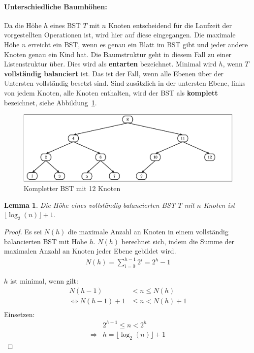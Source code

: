 \documentclass[a4paper,12pt]{article}
\newtheorem{Lemma}{Lemma}[section]
\begin{document}
\paragraph{Unterschiedliche Baumhöhen:}
Da die Höhe $h$ eines BST $T$ mit $n$ Knoten entscheidend für die Laufzeit der vorgestellten Operationen ist, wird hier auf diese eingegangen. Die maximale Höhe $n$ erreicht ein BST, wenn es genau ein Blatt im BST gibt und jeder andere Knoten genau ein Kind hat. Die Baumstruktur geht in diesem Fall zu einer Listenstruktur über. Dies wird als \textbf{entarten} bezeichnet. Minimal wird $h$, wenn $T$ \textbf{vollständig balanciert} ist. Das ist der Fall, wenn alle Ebenen über der Untersten vollständig besetzt sind. Sind zusätzlich in der untersten Ebene, links von jedem Knoten, alle Knoten enthalten, wird der BST als \textbf{komplett} bezeichnet, siehe \mbox{Abbildung \ref{fig:kompletterBaum}}. 
\begin{figure}[H]
	\centering
	\includegraphics[width= 1\textwidth]{Medien/Einleitung/kompletterBaum}
	\caption{Kompletter BST mit 12 Knoten}
	\label{fig:kompletterBaum}
\end{figure}


\begin{Lemma} Die Höhe eines vollständig balancierten BST $T$ mit $n$ Knoten ist $ \lfloor \log_2{(n)} \rfloor + 1 $. 
\end{Lemma}
\begin{proof}
	
	Es sei $\mathit{N(h)}$ die maximale Anzahl an Knoten in einem vollständig balancierten BST mit Höhe $h$.
	$\mathit{N(h)}$  berechnet sich, indem die Summe der maximalen Anzahl an Knoten jeder Ebene gebildet wird.\\
	\begin{align*}
	\mathit{N(h)} = \sum\limits_{i=0}^{h-1} 2^i = 2^h - 1 
	\end{align*}
	
	\noindent	$h$ ist minimal, wenn gilt:\\
	\begin{align*}
	\mathit{N(h-1)} &< n \leq \mathit{N(h)}\\
	\Leftrightarrow \mathit{N(h-1)} + 1 &\leq n < \mathit{N(h)} + 1\\
	\end{align*}
	Einsetzen:\\
	\begin{align*}
	&2^{h - 1} \leq n < 2^h\\
	\Rightarrow & h =  \lfloor \log_2{(n)} \rfloor + 1
	\end{align*}
	
\end{proof}
\end{document}
